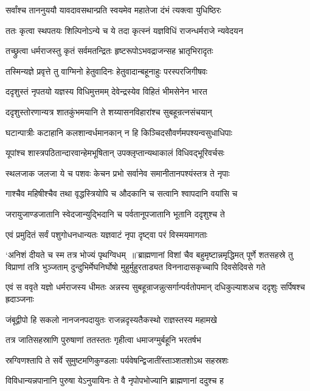 \twolineshloka
{सर्वांश्च ताननुययौ यावदावसथान्प्रति}
{स्वयमेव महातेजा दंभं त्यक्त्वा युधिष्ठिरः}


\twolineshloka
{ततः कृत्वा स्थपतयः शिल्पिनोऽन्ये च ये तदा}
{कृत्स्नं यज्ञविधिं राजन्धर्मराजे न्यवेदयन}


\twolineshloka
{तच्छ्रुत्वा धर्मराजस्तु कृतं सर्वमतन्द्रितः}
{हृष्टरूपोऽभवद्राजन्सह भ्रातृभिरादृतः}


\twolineshloka
{तस्मिन्यज्ञे प्रवृत्ते तु वाग्मिनो हेतुवादिनः}
{हेतुवादान्बहूनाहुः परस्परजिगीषवः}


\twolineshloka
{ददृशुस्तं नृपतयो यज्ञस्य विधिमुत्तमम्}
{देवेन्द्रस्येव विहितं भीमसेनेन भारत}


\twolineshloka
{ददृशुस्तोरणान्यत्र शातकुंभमयानि ते}
{शय्यासनविहारांश्च सुबहून्रत्नसंचयान्}


\twolineshloka
{घटान्पात्रीः कटाहानि कलशान्वर्धमानकान्}
{न हि किञ्चिदसौवर्णमपश्यन्वसुधाधिपाः}


\twolineshloka
{यूपांश्च शास्त्रपठितान्दारवान्हेमभूषितान्}
{उपक्लृप्तान्यथाकालं विधिवद्भूरिवर्चसः}


\twolineshloka
{स्थलजाक जलजा ये च पशवः केचन प्रभो}
{सर्वानेव समानीतानपश्यंस्तत्र ते नृपाः}


\twolineshloka
{गाश्चैव महिषीश्चैव तथा वृद्धस्त्रियोपि च}
{औदकानि च सत्वानि श्वापदानि वयांसि च}


\twolineshloka
{जरायुजाण्डजातानि स्वेदजान्युद्भिदानि च}
{पर्वतानूपजातानि भूतानि ददृशुश्च ते}


\twolineshloka
{एवं प्रमुदितं सर्वं पशुगोधनधान्यतः}
{यज्ञवाटं नृपा दृष्ट्वा परं विस्मयमागताः}


`अनिशं दीयते च स्म तत्र भोज्यं पृथग्विधम् ॥'ब्राह्मणानां विशां चैव बहुमृष्टान्नमृद्धिमत्
\threelineshloka
{पूर्णे शतसहस्रे तु विप्राणां तत्रि भुञ्जताम्}
{दुन्दुभिर्मेघनिर्घोषो मुहुर्मुहुरताड्यत}
{विननादासकृच्चापि दिवसेदिवसे गते}


\threelineshloka
{एवं स ववृते यज्ञो धर्मराजस्य धीमतः}
{अन्नस्य सुबहून्राजन्नुत्सर्गान्पर्वतोपमान्}
{दधिकुल्याशअच ददृशुः सर्पिषश्च ह्रदाञ्जनाः}


\twolineshloka
{जंबूद्वीपो हि सकलो नानजनपदायुतः}
{राजन्नदृस्यतैकस्थो राज्ञस्तस्य महामखे}


\twolineshloka
{तत्र जातिसहस्राणि पुरुषाणां ततस्ततः}
{गृहीत्वा धमाजग्मुर्बहूनि भरतर्षभ}


\twolineshloka
{स्रग्विणश्तापि ते सर्वे सुमुष्टमणिकुण्डलाः}
{पर्यवेषन्द्विजातींस्ताञ्शतशोऽथ सहस्रशः}


\twolineshloka
{विविधान्यन्नपानानि पुरुषा येऽनुयायिनः}
{ते वै नृपोपभोज्यानि ब्राह्मणानां ददुश्च ह}


